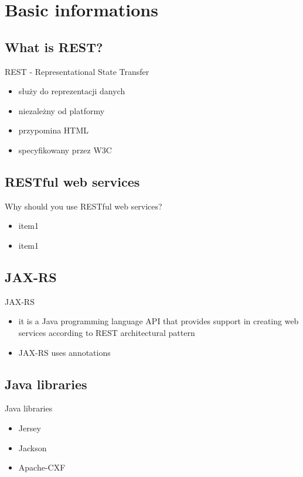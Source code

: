 \section{Basic informations}

\subsection{What is REST?}
	\begin{frame}{REST - Representational State Transfer}
		    	\begin{itemize}
				  \item służy do reprezentacji danych
				  \item niezależny od platformy
				  \item przypomina HTML 
				  \item specyfikowany przez W3C   
				\end{itemize}
	\end{frame}
	
\subsection{RESTful web services} 
	\begin{frame}{Why should you use RESTful web services?}
    	\begin{itemize}
			\item item1
			\item item1
		\end{itemize}
	\end{frame}
  
\subsection{JAX-RS}
	\begin{frame}{JAX-RS}
    	\begin{itemize}
			\item it is a Java programming language API that provides support in creating web services according to REST architectural pattern
			\item JAX-RS uses annotations
		\end{itemize}
	\end{frame}
	
\subsection{Java libraries}
	\begin{frame}{Java libraries}
		\begin{itemize}
			\item Jersey
			\item Jackson
			\item Apache-CXF
		\end{itemize}
	\end{frame}
	
	
